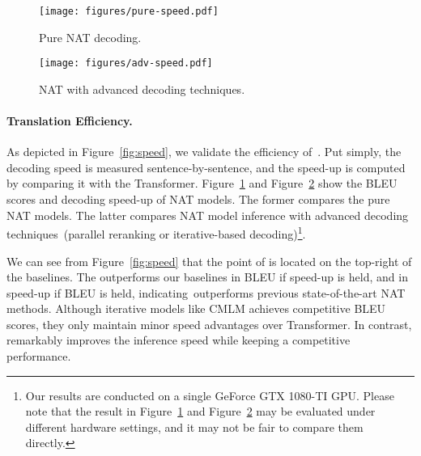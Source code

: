 \begin{figure*}[tbp]
    \begin{subfigure}[t]{0.495\linewidth}
    \texttt{[image: figures/pure-speed.pdf]}
    \caption{Pure NAT decoding.}
    \label{fig:pure_speed}
    \end{subfigure}
    \begin{subfigure}[t]{0.495\linewidth}
    \texttt{[image: figures/adv-speed.pdf]}
    \caption{NAT with advanced decoding techniques.}
    \centering
    \label{fig:adv_speed}
\end{subfigure}
\caption{BLEU and decoding speed-up of NAT models on WMT14 DE-EN test set. Each point represents the decoding method run with its corresponding setting in Table~\ref{tab:kd_mt}, Table~\ref{tab:lpd_mt} or Table~\ref{tab:iter_mt}. }
\label{fig:speed}
\end{figure*}
\paragraph{Translation Efficiency.} 
As depicted in Figure~\ref{fig:speed}, we validate the efficiency of~\method. 
Put simply, the decoding speed is measured sentence-by-sentence, and the speed-up is computed by comparing it with the Transformer.
Figure~\ref{fig:pure_speed} and Figure~\ref{fig:adv_speed} show the BLEU scores and decoding speed-up of NAT models. 
The former compares the pure NAT models. 
The latter compares NAT model inference with advanced decoding techniques~(parallel reranking or iterative-based decoding)\footnote{Our results are conducted on a single GeForce GTX 1080-TI GPU. Please note that the result in Figure~\ref{fig:pure_speed} and Figure~\ref{fig:adv_speed} may be evaluated under different hardware settings, and it may not be fair to compare them directly.}.  

We can see from Figure~\ref{fig:speed} that the point of \method is located on the top-right of the baselines. 
The \method outperforms our baselines in BLEU if speed-up is held, and in speed-up if BLEU is held, indicating~\method outperforms previous state-of-the-art NAT methods. 
Although iterative models like CMLM achieves competitive BLEU scores, they only maintain minor speed advantages over Transformer. 
In contrast, \method remarkably improves the inference speed while keeping a competitive performance.

